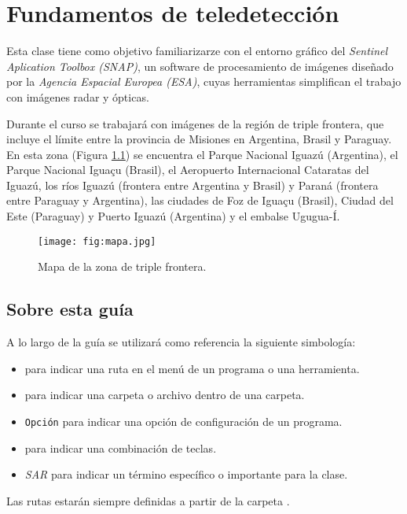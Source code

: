 \chapter{Fundamentos de teledetección}

Esta clase tiene como objetivo familiarizarze con el entorno gráfico del \emph{Sentinel Aplication Toolbox (SNAP)}, un software de procesamiento de imágenes diseñado por la \emph{Agencia Espacial Europea (ESA)}, cuyas herramientas simplifican el trabajo con imágenes radar y ópticas.

Durante el curso se trabajará con imágenes de la región de triple frontera, que incluye el límite entre la provincia de Misiones en Argentina, Brasil y Paraguay. En esta zona (Figura \ref{fig:mapa}) se encuentra el Parque Nacional Iguazú (Argentina), el Parque Nacional Iguaçu (Brasil), el Aeropuerto Internacional Cataratas del Iguazú, los ríos Iguazú (frontera entre Argentina y Brasil) y Paraná (frontera entre Paraguay y Argentina), las ciudades de Foz de Iguaçu (Brasil), Ciudad del Este (Paraguay) y Puerto Iguazú (Argentina) y el embalse Ugugua-Í.

\begin{figure}[h!]
    \centering
    \texttt{[image: fig:mapa.jpg]}
    \caption{Mapa de la zona de triple frontera.}
    \label{fig:mapa}
\end{figure}

\section{Sobre esta guía}

A lo largo de la guía se utilizará como referencia la siguiente simbología:

\begin{itemize}
  \item {} para indicar una ruta en el menú de un programa o una herramienta.
  \item {} para indicar una carpeta o archivo dentro de una carpeta.
  \item \texttt{Opción} para indicar una opción de configuración de un programa.
  \item {} para indicar una combinación de teclas.
  \item \emph{SAR} para indicar un término específico o importante para la clase.
\end{itemize}

Las rutas estarán siempre definidas a partir de la carpeta .

